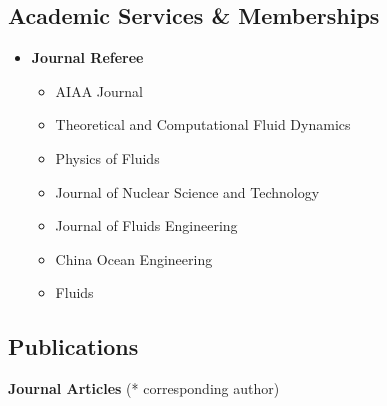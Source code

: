 \documentclass[10pt]{article}
\newenvironment{myitemize}
{ \begin{itemize}
    \setlength{\itemsep}{0pt}
    \setlength{\parskip}{0pt}
    \setlength{\parsep}{0pt}     }
{ \end{itemize}                  }
\begin{document}
\vspace{-0.1in}
\subsection*{Academic Services \& Memberships}
\begin{itemize}

\item {\bf Journal Referee}
	\begin{myitemize}
	\item AIAA Journal
  \item Theoretical and Computational Fluid Dynamics
	\item Physics of Fluids
	\item Journal of Nuclear Science and Technology
	\item Journal of Fluids Engineering
	\item China Ocean Engineering
	\item Fluids
	\end{myitemize}
		\vspace{-0.1in}
		
\end{itemize}

\vspace{-0.1in}

\subsection*{Publications}
{\bf \color{Blue}Journal Articles} (*  corresponding author)
\end{document}
